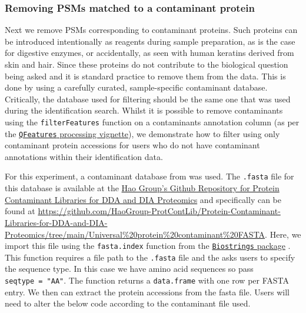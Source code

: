 \documentclass[9pt,a4paper,]{extarticle}
\begin{document}
\hypertarget{removing-psms-matched-to-a-contaminant-protein}{%
\subsubsection{Removing PSMs matched to a contaminant protein}\label{removing-psms-matched-to-a-contaminant-protein}}

Next we remove PSMs corresponding to contaminant proteins. Such proteins can be
introduced intentionally as reagents during sample preparation, as is the case
for digestive enzymes, or accidentally, as seen with human keratins derived from
skin and hair. Since these proteins do not contribute to the biological question
being asked and it is standard practice to remove them from the data. This is
done by using a carefully curated, sample-specific contaminant database.
Critically, the database used for filtering should be the same one that was used
during the identification search. Whilst it is possible to remove contaminants
using the \texttt{filterFeatures} function on a contaminants annotation column (as per
the \href{https://bioconductor.org/packages/release/bioc/vignettes/QFeatures/inst/doc/Processing.html}{\texttt{QFeatures} processing vignette}),
we demonstrate how to filter using only contaminant protein accessions for users
who do not have contaminant annotations within their identification data.

For this experiment, a contaminant database from \citep{Frankenfield2022} was used.
The \texttt{.fasta} file for this database is available at the \href{Protein\%20Contaminant\%20Libraries\%20for\%20DDA\%20and\%20DIA\%20Proteomics}{Hao Group's Github Repository for Protein Contaminant Libraries for DDA and DIA Proteomics}
and specifically can be found at \url{https://github.com/HaoGroup-ProtContLib/Protein-Contaminant-Libraries-for-DDA-and-DIA-Proteomics/tree/main/Universal\%20protein\%20contaminant\%20FASTA}.
Here, we import this file using the \texttt{fasta.index} function from the
\href{https://bioconductor.org/packages/release/bioc/html/Biostrings.html}{\texttt{Biostrings} package}
\citep{biostrings}. This function requires a file path to the \texttt{.fasta} file and the
asks users to specify the sequence type. In this case we have amino acid
sequences so pass \texttt{seqtype\ =\ "AA"}. The function returns a \texttt{data.frame} with one
row per FASTA entry. We then can extract the protein accessions from the fasta
file. Users will need to alter the below code according to the contaminant file
used.
\end{document}
